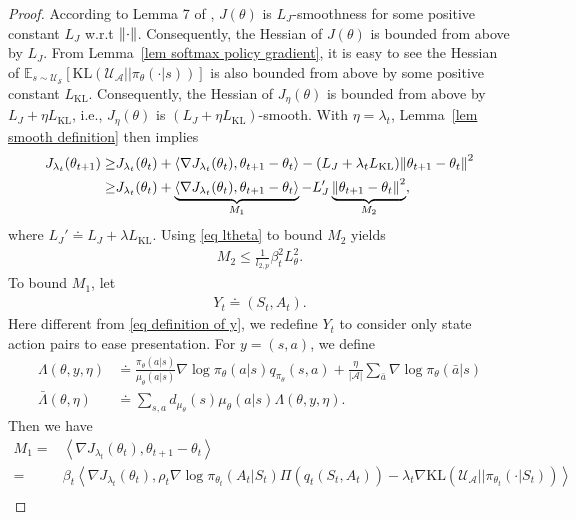 \documentclass[twoside,11pt]{article}
\newcommand{\fS}{\mathcal{S}}
\newcommand{\fA}{\mathcal{A}}
\newcommand{\fU}{\mathcal{U}}
\newcommand{\E}{\mathbb{E}}
\newcommand{\na}{{|\fA|}}
\newcommand{\indot}[2]{{\left<#1, #2\right>}}
\newcommand{\kl}[2]{\text{KL}\left(#1||#2\right)}
\numberwithin{assucounter}{section}
\begin{document}
\begin{proof}
  According to Lemma 7 of \citet{mei2020global}, $J(\theta)$ is $L_J$-smoothness for some positive constant $L_J$ w.r.t $\norm{\cdot}$.
  Consequently,
  the Hessian of $J(\theta)$ is bounded from above by $L_J$.
  From Lemma~\ref{lem softmax policy gradient},
  it is easy to see the Hessian of $\E_{s \sim \fU_\fS} \left[\kl{\fU_\fA}{\pi_\theta(\cdot |s)}\right]$ is also bounded from above by some positive constant $L_{\text{KL}}$.
  Consequently,
  the Hessian of $J_\eta(\theta)$ is bounded from above by $L_J + \eta L_{\text{KL}}$,
  i.e.,
  $J_\eta(\theta)$ is $(L_J + \eta L_\text{KL})$-smooth.
  With $\eta = \lambda_t$,
  Lemma~\ref{lem smooth definition} then implies
  \begin{align}
    \label{eq j lambda smooth inequality}
    J_{\lambda_t}(\theta_{t+1}) \geq& J_{\lambda_t}(\theta_t) + \indot{\nabla J_{\lambda_t}(\theta_t)}{\theta_{t+1} - \theta_t} - (L_J + \lambda_t L_{\text{KL}}) \norm{\theta_{t+1}-\theta_t}^2 \\
    \geq& J_{\lambda_t}(\theta_t) + \underbrace{\indot{\nabla J_{\lambda_t}(\theta_t)}{\theta_{t+1} - \theta_t}}_{M_1} - L_J' \underbrace{\norm{\theta_{t+1}-\theta_t}^2}_{M_2},
  \end{align}
  where $L_J' \doteq L_J + \lambda L_\text{KL}$.
  Using \eqref{eq ltheta} to bound $M_2$ yields
  \begin{align}
    M_2 \leq \frac{1}{l_{2,p}} \beta_t^2 L_\theta^2.
  \end{align}
  To bound $M_1$, 
  let 
  \begin{align}
    \label{eq actor yt}
    Y_t \doteq (S_t, A_t).
  \end{align}
  Here different from \eqref{eq definition of y},
  we redefine $Y_t$ to consider only state action pairs to ease presentation.
  For $y = (s, a)$, we define
  \begin{align}
    \label{eq actor helper function}
    \Lambda(\theta, y, \eta) &\doteq \frac{\pi_{\theta}(a|s)}{\mu_{\theta}(a|s)} \nabla \log \pi_\theta(a|s) q_{\pi_\theta}(s, a) + \frac{\eta}{\na} \sum_{\bar a} \nabla \log \pi_\theta(\bar a | s) \\
    \bar \Lambda(\theta, \eta) &\doteq \sum_{s, a} d_{\mu_\theta}(s) \mu_\theta(a|s) \Lambda(\theta, y, \eta).
  \end{align}
  Then we have
  \begin{align}
    M_1 = &\indot{\nabla J_{\lambda_t}(\theta_t)}{\theta_{t+1} - \theta_t} \\
    =&\beta_t \indot{\nabla J_{\lambda_t}(\theta_t)}{ \rho_t  \nabla \log \pi_{\theta_t}(A_t | S_t) \Pi (q_t(S_t, A_t)) - \lambda_t \nabla \kl{\fU_\fA}{\pi_{\theta_t}(\cdot | S_t)} } \\

\end{align}
\end{proof}
\end{document}
